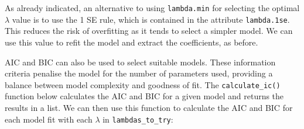 \documentclass[
  letterpaper,
]{book}
\begin{document}
As already indicated, an alternative to using \texttt{lambda.min} for
selecting the optimal \(\lambda\) value is to use the 1 SE rule, which
is contained in the attribute \texttt{lambda.1se}. This reduces the risk
of overfitting as it tends to select a simpler model. We can use this
value to refit the model and extract the coefficients, as before.

AIC and BIC can also be used to select suitable models. These
information criteria penalise the model for the number of parameters
used, providing a balance between model complexity and goodness of fit.
The \texttt{calculate\_ic()} function below calculates the AIC and BIC
for a given model and returns the results in a list. We can then use
this function to calculate the AIC and BIC for each model fit with each
\(\lambda\) in \texttt{lambdas\_to\_try}:
\end{document}
